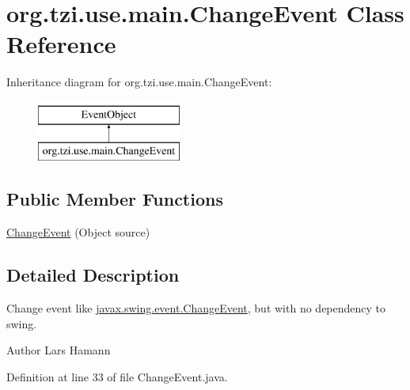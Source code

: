 \hypertarget{classorg_1_1tzi_1_1use_1_1main_1_1_change_event}{\section{org.\-tzi.\-use.\-main.\-Change\-Event Class Reference}
\label{classorg_1_1tzi_1_1use_1_1main_1_1_change_event}
}
Inheritance diagram for org.\-tzi.\-use.\-main.\-Change\-Event\-:\begin{figure}[H]
\begin{center}
\leavevmode
\includegraphics[height=2.000000cm]{classorg_1_1tzi_1_1use_1_1main_1_1_change_event}
\end{center}
\end{figure}
\subsection*{Public Member Functions}
\begin{DoxyCompactItemize}
\item 
\hyperlink{classorg_1_1tzi_1_1use_1_1main_1_1_change_event_ab7a89bb4a1724e43bca8bab46595426b}{Change\-Event} (Object source)
\end{DoxyCompactItemize}


\subsection{Detailed Description}
Change event like \hyperlink{}{javax.\-swing.\-event.\-Change\-Event}, but with no dependency to swing. \begin{DoxyAuthor}{Author}
Lars Hamann 
\end{DoxyAuthor}


Definition at line 33 of file Change\-Event.\-java.




